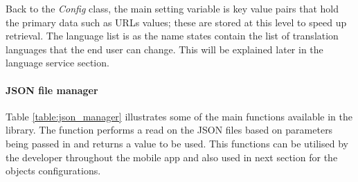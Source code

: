 Back to the \textit{Config }class, the main setting variable is key value pairs that hold the primary data such as URLs values; these are stored at this level to speed up retrieval. The language list is as the name states contain the list of translation languages that the end user can change. This will be explained later in the language service section.

% 



\paragraph{JSON file manager}

Table \ref{table:json_manager} illustrates some of the main functions available in the library. The function performs a read on the JSON files based on parameters being passed in and returns a value to be used. This functions can be utilised by the developer throughout the mobile app and also used in next section for the objects configurations.

